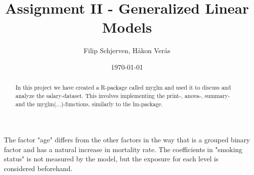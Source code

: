 \documentclass{article}
\title{Assignment II - Generalized Linear Models}
\author{Filip Schjerven, Håkon Verås}
\date{\today}
\begin{document}
\maketitle
\begin{abstract}
In this project we have created a R-package called myglm and used it to discuss and analyze the salary-dataset. This involves implementing the print-, anova-, summary- and the myglm(...)-functions, similarly to the lm-package.
\end{abstract}
\newpage

\section{}

\subsection{}
The factor "age" differs from the other factors in the way that is a grouped binary factor and has a natural increase in mortality rate. The coefficients in "smoking status" is not measured by the model, but the exposure for each level is considered beforehand.

\subsection{}


\section{}
\subsection{}
\end{document}
